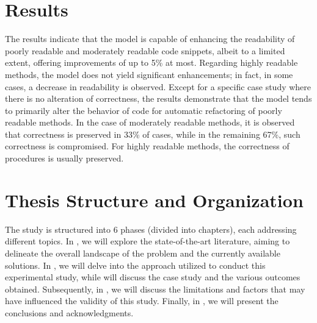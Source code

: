\section{Results}
The results indicate that the model is capable of enhancing the readability of poorly readable and moderately readable code snippets, albeit to a limited extent, offering improvements of up to 5\% at most. Regarding highly readable methods, the model does not yield significant enhancements; in fact, in some cases, a decrease in readability is observed.\newline
Except for a specific case study where there is no alteration of correctness, the results demonstrate that the model tends to primarily alter the behavior of code for automatic refactoring of poorly readable methods. In the case of moderately readable methods, it is observed that correctness is preserved in 33\% of cases, while in the remaining 67\%, such correctness is compromised. For highly readable methods, the correctness of procedures is usually preserved.
\section{Thesis Structure and Organization}
The study is structured into 6 phases (divided into chapters), each addressing different topics. In , we will explore the state-of-the-art literature, aiming to delineate the overall landscape of the problem and the currently available solutions. In , we will delve into the approach utilized to conduct this experimental study, while  will discuss the case study and the various outcomes obtained. Subsequently, in , we will discuss the limitations and factors that may have influenced the validity of this study. Finally, in , we will present the conclusions and acknowledgments.
